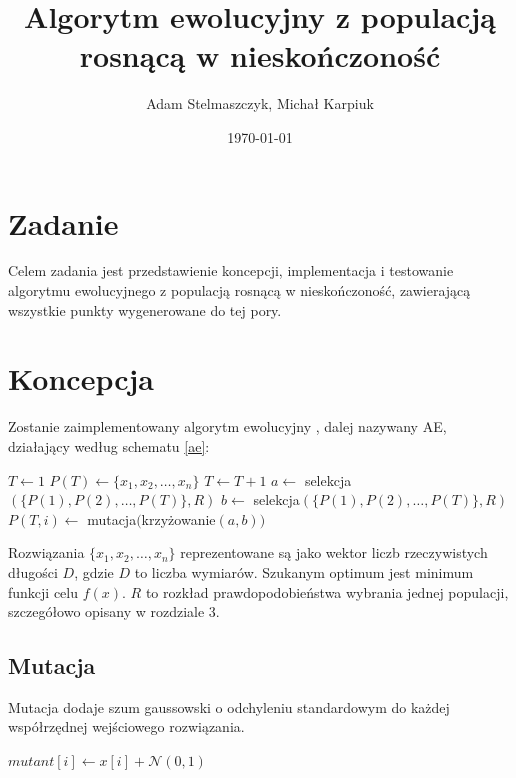 \documentclass[12pt, a4paper]{article}
\title{\textbf{Algorytm ewolucyjny z populacją rosnącą w nieskończoność}}
\author{Adam Stelmaszczyk, Michał Karpiuk}
\date{\today}
\begin{document}
\maketitle

\section{Zadanie}

Celem zadania jest przedstawienie koncepcji, implementacja i testowanie algorytmu ewolucyjnego z populacją rosnącą
w nieskończoność, zawierającą wszystkie punkty wygenerowane do tej pory.

\section{Koncepcja}

Zostanie zaimplementowany algorytm ewolucyjny \cite{jarabas}, dalej nazywany AE, 
działający według schematu \ref{ae}:

\begin{algorithm}[H]
\label{ae}
\begin{algorithmic}[1]
  \State $T \gets 1$
  \State $P(T) \gets \{x_1, x_2, \ldots, x_n\}$
    \State $T \gets T+1$
      \State $a \gets$ selekcja$(\{P(1), P(2), \dots, P(T)\}, R)$
      \State $b \gets$ selekcja$(\{P(1), P(2), \dots, P(T)\}, R)$
      \State $P(T,i) \gets$ mutacja$($krzy{\.z}owanie$(a, b))$
    \EndFor    
  \EndWhile
\EndFunction
\end{algorithmic}
\end{algorithm}

Rozwiązania $\{x_1, x_2, \ldots, x_n\}$ reprezentowane są jako wektor liczb rzeczywistych długości $D$,
gdzie $D$ to liczba wymiarów. Szukanym optimum jest minimum funkcji celu $f(x)$. $R$ to rozkład prawdopodobieństwa
wybrania jednej populacji, szczegółowo opisany w rozdziale 3.

\subsection{Mutacja}

Mutacja dodaje szum gaussowski o odchyleniu standardowym do każdej współrzędnej wejściowego rozwiązania.

\begin{algorithm}[H]
\begin{algorithmic}[1]
    \State $mutant[i] \gets x[i] + \mathcal{N}(0, 1)$
  \EndFor
\EndFunction
\end{algorithmic}
\end{algorithm}
\end{document}
